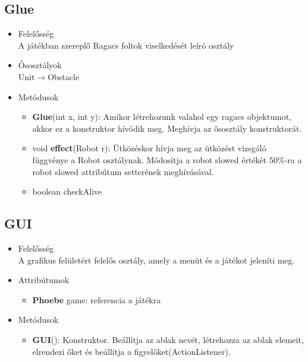 \subsection{Glue}
\begin{itemize}
\item Felelősség\\
A játékban szereplő Ragacs foltok viselkedését leíró osztály
\item Ősosztályok\\
Unit$\rightarrow$Obstacle
\item Metódusok
	\begin{itemize}
	    \item \textbf{Glue}(int x, int y): Amikor létrehozunk valahol egy ragacs objektumot, akkor ez a konstruktor hívódik meg. Meghívja az ősosztály konstruktorát.
		\item void \textbf{effect}(Robot r): Ütközéskor hívja meg az ütközést vizsgáló függvénye a Robot osztálynak. Módosítja a robot slowed értékét 50\%-ra a robot slowed attribútum setterének meghívásával.
		\item boolean checkAlive 
	\end{itemize}
\end{itemize}

\subsection{GUI}
\begin{itemize}
\item Felelősség\\
A grafikus felületért felelős osztály, amely a menüt és a játékot jeleníti meg.
\item Attribútumok
	\begin{itemize}
		\item \textbf{Phoebe} game: referencia a játékra
	\end{itemize}
\item Metódusok
	\begin{itemize}
		\item\textbf{GUI}(): Konstruktor. Beállítja az ablak nevét, létrehozza az ablak elemeit, elrendezi őket és beállítja a figyelőket(ActionListener).
	\end{itemize}
\end{itemize}

